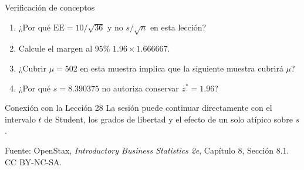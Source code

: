 \documentclass[aspectratio=169,10pt,spanish]{beamer}
\begin{document}
\begin{frame}{Verificación de conceptos}
  \begin{enumerate}
    \item ¿Por qué $\mathrm{EE}=10/\sqrt{36}$ y no $s/\sqrt{n}$ en esta
      lección?
    \item Calcule el margen al 95\% $1.96\times 1.666667$.
    \item ¿Cubrir $\mu=502$ en esta muestra implica que la siguiente
      muestra cubrirá $\mu$?
    \item ¿Por qué $s=8.390375$ no autoriza conservar $z^{*}=1.96$?
  \end{enumerate}

  \vspace{0.6em}
  \begin{block}{Conexión con la Lección 28}
    La sesión puede continuar directamente con el intervalo $t$ de Student,
    los grados de libertad y el efecto de un solo atípico sobre $s$.
  \end{block}

  \vfill
  \scriptsize Fuente: OpenStax, \textit{Introductory Business Statistics 2e},
  Capítulo 8, Sección 8.1. CC BY-NC-SA.
\end{frame}

\appendix
\end{document}
